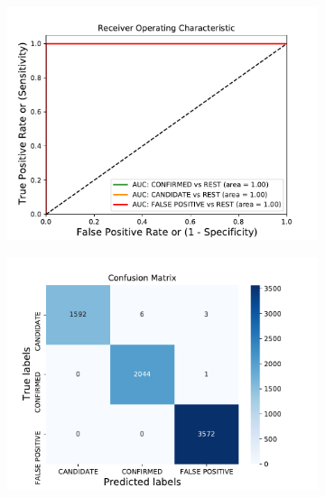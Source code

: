 \begin{figure}[H]
                \begin{mdframed}[linecolor=green]
                \centering
                \begin{subfigure}{.49\textwidth}
                \includegraphics[width = 1\textwidth]{data/XGB_vif_cap2_overfit_roc.pdf}
                \end{subfigure}
                \begin{subfigure}{.49\textwidth}
                \includegraphics[width = 1\textwidth]{data/XGB_vif_cap2_overfit_cm.pdf}
                \end{subfigure}
                \begin{subfigure}{.49\textwidth}

\end{subfigure}
\end{mdframed}
\end{figure}
